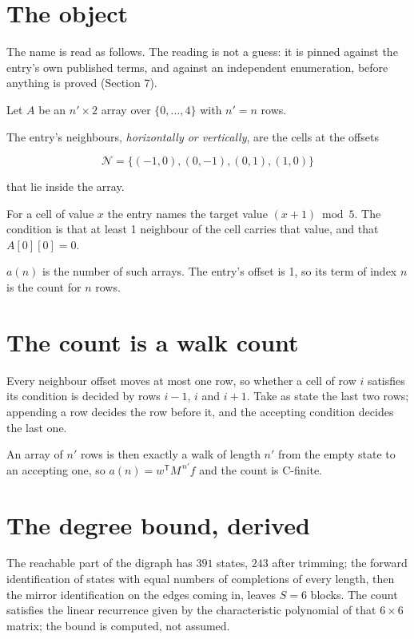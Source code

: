 \documentclass[11pt]{article}
\theoremstyle{definition}
\begin{document}
\section{The object}

The name is read as follows. The reading is not a guess: it is pinned against the entry's own published terms, and against an independent enumeration, before anything is proved (Section 7).

Let $A$ be an $n' \times 2$ array over $\{0,\dots,4\}$ with $n' = n$ rows.

The entry's neighbours, {\itshape horizontally or vertically}, are the cells at the offsets

\[\mathcal{N} = \{(-1,0), (0,-1), (0,1), (1,0)\}\]

that lie inside the array.

For a cell of value $x$ the entry names the target value $(x + 1) \bmod 5$. The condition is that at least 1 neighbour of the cell carries that value, and that $A[0][0] = 0$.

$a(n)$ is the number of such arrays. The entry's offset is 1, so its term of index $n$ is the count for $n$ rows.

\section{The count is a walk count}

Every neighbour offset moves at most one row, so whether a cell of row $i$ satisfies its condition is decided by rows $i-1$, $i$ and $i+1$. Take as state the last two rows; appending a row decides the row before it, and the accepting condition decides the last one.

An array of $n'$ rows is then exactly a walk of length $n'$ from the empty state to an accepting one, so $a(n) = w^{\mathsf T}M^{\,n'}f$ and the count is C-finite.

\section{The degree bound, derived}

The reachable part of the digraph has $391$ states, $243$ after trimming; the forward identification of states with equal numbers of completions of every length, then the mirror identification on the edges coming in, leaves $S = 6$ blocks. The count satisfies the linear recurrence given by the characteristic polynomial of that $6\times6$ matrix; the bound is computed, not assumed.
\end{document}
